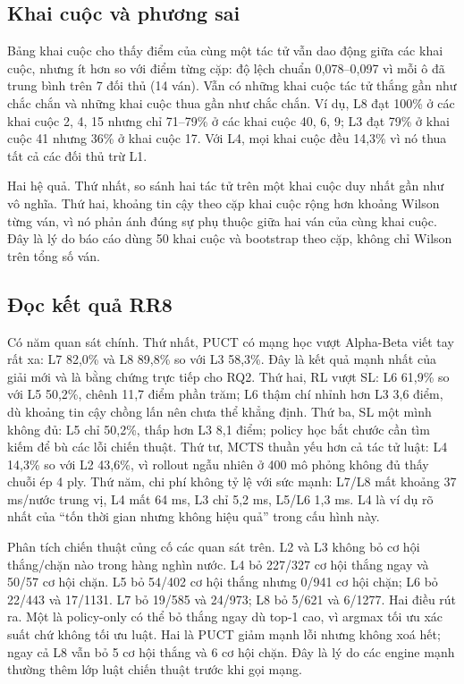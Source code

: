 \subsection{Khai cuộc và phương sai}
\begin{table}[H]
  \centering\small
  \caption{Điểm theo khai cuộc: trung bình, độ lệch chuẩn và ba khai cuộc tốt/xấu nhất của từng
  tác tử trong RR8.}
  \label{tab:tn-khai-cuoc}
  
\end{table}
Bảng khai cuộc cho thấy điểm của cùng một tác tử vẫn dao động giữa các khai cuộc, nhưng ít hơn
so với điểm từng cặp: độ lệch chuẩn 0,078--0,097 vì mỗi ô đã trung bình trên 7 đối thủ (14
ván). Vẫn có những khai cuộc tác tử thắng gần như chắc chắn và những khai cuộc thua gần như
chắc chắn. Ví dụ, L8 đạt 100\% ở các khai cuộc 2, 4, 15 nhưng chỉ 71--79\% ở các khai cuộc 40,
6, 9; L3 đạt 79\% ở khai cuộc 41 nhưng 36\% ở khai cuộc 17. Với L4, mọi khai cuộc đều 14,3\%
vì nó thua tất cả các đối thủ trừ L1.

Hai hệ quả. Thứ nhất, so sánh hai tác tử trên một khai cuộc duy nhất gần như vô nghĩa. Thứ hai,
khoảng tin cậy theo cặp khai cuộc rộng hơn khoảng Wilson từng ván, vì nó phản ánh đúng sự phụ
thuộc giữa hai ván của cùng khai cuộc. Đây là lý do báo cáo dùng 50 khai cuộc và bootstrap theo
cặp, không chỉ Wilson trên tổng số ván.

\subsection{Đọc kết quả RR8}
Có năm quan sát chính. Thứ nhất, PUCT có mạng học vượt Alpha-Beta viết tay rất xa: L7 82,0\% và
L8 89,8\% so với L3 58,3\%. Đây là kết quả mạnh nhất của giải mới và là bằng chứng trực tiếp cho
RQ2. Thứ hai, RL vượt SL: L6 61,9\% so với L5 50,2\%, chênh 11,7 điểm phần trăm; L6 thậm chí
nhỉnh hơn L3 3,6 điểm, dù khoảng tin cậy chồng lấn nên chưa thể khẳng định. Thứ ba, SL một mình
không đủ: L5 chỉ 50,2\%, thấp hơn L3 8,1 điểm; policy học bắt chước cần tìm kiếm để bù các lỗi
chiến thuật. Thứ tư, MCTS thuần yếu hơn cả tác tử luật: L4 14,3\% so với L2 43,6\%, vì rollout
ngẫu nhiên ở 400 mô phỏng không đủ thấy chuỗi ép 4 ply. Thứ năm, chi phí không tỷ lệ với sức
mạnh: L7/L8 mất khoảng 37 ms/nước trung vị, L4 mất 64 ms, L3 chỉ 5,2 ms, L5/L6 1,3 ms. L4 là
ví dụ rõ nhất của ``tốn thời gian nhưng không hiệu quả'' trong cấu hình này.

Phân tích chiến thuật củng cố các quan sát trên. L2 và L3 không bỏ cơ hội thắng/chặn nào trong
hàng nghìn nước. L4 bỏ 227/327 cơ hội thắng ngay và 50/57 cơ hội chặn. L5 bỏ 54/402 cơ hội
thắng nhưng 0/941 cơ hội chặn; L6 bỏ 22/443 và 17/1131. L7 bỏ 19/585 và 24/973; L8 bỏ 5/621 và
6/1277. Hai điều rút ra. Một là policy-only có thể bỏ thắng ngay dù top-1 cao, vì argmax tối ưu
xác suất chứ không tối ưu luật. Hai là PUCT giảm mạnh lỗi nhưng không xoá hết; ngay cả L8 vẫn
bỏ 5 cơ hội thắng và 6 cơ hội chặn. Đây là lý do các engine mạnh thường thêm lớp luật chiến
thuật trước khi gọi mạng.

